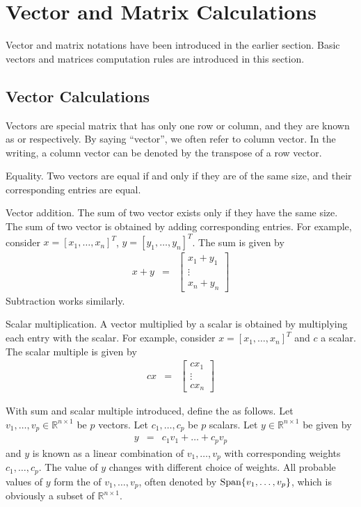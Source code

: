 \section{Vector and Matrix Calculations}

Vector and matrix notations have been introduced in the earlier section. Basic vectors and matrices computation rules are introduced in this section.

\subsection{Vector Calculations}

Vectors are special matrix that has only one row or column, and they are known as  or  respectively. By saying ``vector'', we often refer to column vector. In the writing, a column vector can be denoted by the transpose of a row vector.

Equality. Two vectors are equal if and only if they are of the same size, and their corresponding entries are equal.

Vector addition. The sum of two vector exists only if they have the same size. The sum of two vector is obtained by adding corresponding entries. For example, consider $x = [x_1, \ldots, x_n]^T$, $y = [y_1, \ldots, y_n]^T$. The sum is given by
\begin{eqnarray}
  x + y &=& \left[\begin{array}{c}
                   x_1 + y_1 \\
                   \vdots \\
                   x_n + y_n 
                 \end{array}\right] \nonumber
\end{eqnarray}
Subtraction works similarly.

Scalar multiplication. A vector multiplied by a scalar is obtained by multiplying each entry with the scalar. For example, consider $x = [x_1, \ldots, x_n]^T$ and $c$ a scalar. The scalar multiple is given by
\begin{eqnarray}
  cx &=& \left[\begin{array}{c}
                 cx_1 \\
                 \vdots \\
                 cx_n 
               \end{array}\right] \nonumber
\end{eqnarray}

With sum and scalar multiple introduced, define the  as follows. Let $v_1, \ldots, v_p \in \mathbb{R}^{n\times 1}$ be $p$ vectors. Let $c_1,\ldots, c_p$ be $p$ scalars. Let $y\in \mathbb{R}^{n\times 1}$ be given by
\begin{eqnarray}
  y &=& c_1v_1 + \ldots + c_pv_p \nonumber
\end{eqnarray}
and $y$ is known as a linear combination of $v_1, \ldots, v_p$ with corresponding weights $c_1, \ldots, c_p$. The value of $y$ changes with different choice of weights. All probable values of $y$ form the  of $v_1, \ldots, v_p$, often denoted by $\textup{Span}\{v_1, \ldots, v_p\}$, which is obviously a subset of $\mathbb{R}^{n\times 1}$.

